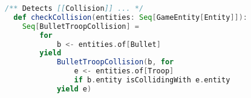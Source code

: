 \begin{lstlisting}[language=Scala, label=code:checkcollision, caption= Metodo che controlla e crea le collisioni.]
/** Detects [[Collision]] ... */
  def checkCollision(entities: Seq[GameEntity[Entity]]): 
    Seq[BulletTroopCollision] =
        for
            b <- entities.of[Bullet]
        yield
            BulletTroopCollision(b, for
                e <- entities.of[Troop]
                if b.entity isCollidingWith e.entity
            yield e)
\end{lstlisting}





